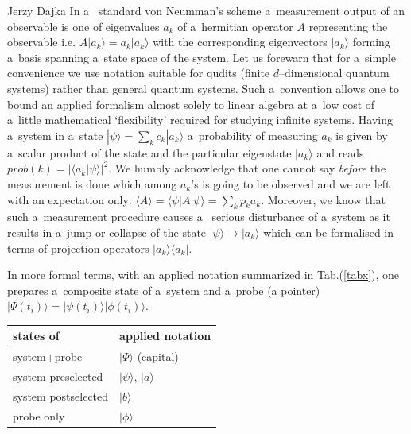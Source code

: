 \begin{artengenv}{Jerzy Dajka}
In a~ standard von Neumman's scheme a~measurement output of an observable   is one of eigenvalues $a_k$ of  a~hermitian operator $A$ representing the observable i.e. $A|a_k\rangle=a_k|a_k\rangle$ with the corresponding eigenvectors  $|a_k\rangle$ forming a~basis spanning a~state space of the system. Let us forewarn that for a~simple convenience we use notation suitable for qudits (finite $d$--dimensional quantum systems) rather than general quantum systems. Such a~convention allows one to bound an applied formalism almost solely to linear algebra at a~low cost of a~little  mathematical `flexibility' required for studying infinite systems.  Having a~system in a~state $|\psi\rangle=\sum_k c_k |a_k\rangle$ a~probability of measuring $a_k$ is given by a~scalar product of the state and the particular eigenstate  $|a_k\rangle$ and reads  $prob(k)=|\langle a_k|\psi\rangle|^2$. We humbly acknowledge that one cannot say {\it before} the measurement is done which among $a_k$'s is going to be  observed and we are left with an expectation only:   $\langle A\rangle =\langle\psi| A|\psi\rangle=\sum_k p_k a_k$. Moreover, we know that such a~measurement procedure
     causes a~ serious disturbance of a~system as it results in  a~jump or collapse of the state $|\psi\rangle\rightarrow|a_k\rangle$ which can be formalised in terms of projection operators $|a_k\rangle\langle a_k|$. 



In more formal terms, with an applied notation summarized in Tab.(\ref{tabx}), one prepares a~composite state of a~system and a~probe (a pointer) 
  $|\Psi(t_i)\rangle=|\psi(t_i)\rangle|\phi(t_i)\rangle$. 
\begin{table}[ht]
\centering
\begin{tabular}{|l||l|}
\hline
states of  &applied  notation \\
\hline
\hline
system+probe & $|\Psi\rangle$ (capital)\\
system preselected& $|\psi\rangle$, $|a\rangle$ \\
system postselected& $|b\rangle$ \\
probe only& $|\phi\rangle$\\
\hline


\end{tabular}
\end{table}
\end{artengenv}
